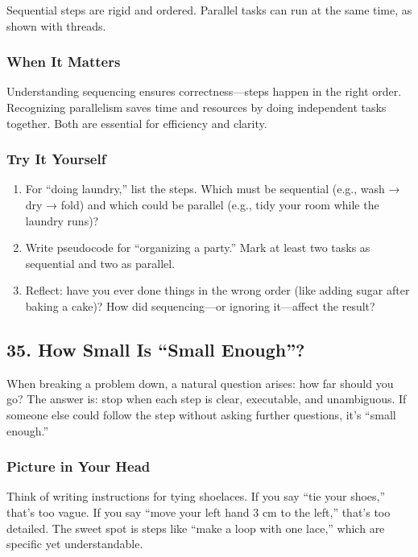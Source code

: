 \documentclass[
  letterpaper,
  DIV=11,
  numbers=noendperiod]{scrreprt}
\providecommand{\tightlist}{%
  \setlength{\itemsep}{0pt}\setlength{\parskip}{0pt}}
\begin{document}
Sequential steps are rigid and ordered. Parallel tasks can run at the
same time, as shown with threads.

\subsubsection{When It Matters}\label{when-it-matters-31}

Understanding sequencing ensures correctness---steps happen in the right
order. Recognizing parallelism saves time and resources by doing
independent tasks together. Both are essential for efficiency and
clarity.

\subsubsection{Try It Yourself}\label{try-it-yourself-33}

\begin{enumerate}
\def\labelenumi{\arabic{enumi}.}
\tightlist
\item
  For ``doing laundry,'' list the steps. Which must be sequential (e.g.,
  wash → dry → fold) and which could be parallel (e.g., tidy your room
  while the laundry runs)?
\item
  Write pseudocode for ``organizing a party.'' Mark at least two tasks
  as sequential and two as parallel.
\item
  Reflect: have you ever done things in the wrong order (like adding
  sugar after baking a cake)? How did sequencing---or ignoring
  it---affect the result?
\end{enumerate}

\subsection{35. How Small Is ``Small
Enough''?}\label{how-small-is-small-enough}

When breaking a problem down, a natural question arises: how far should
you go? The answer is: stop when each step is clear, executable, and
unambiguous. If someone else could follow the step without asking
further questions, it's ``small enough.''

\subsubsection{Picture in Your Head}\label{picture-in-your-head-34}

Think of writing instructions for tying shoelaces. If you say ``tie your
shoes,'' that's too vague. If you say ``move your left hand 3 cm to the
left,'' that's too detailed. The sweet spot is steps like ``make a loop
with one lace,'' which are specific yet understandable.
\end{document}
